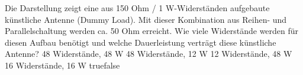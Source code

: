     {Die Darstellung zeigt eine aus 150 Ohm / 1 W-Widerständen aufgebaute künstliche Antenne (Dummy Load). Mit dieser Kombination aus Reihen- und Parallelschaltung werden ca. 50 Ohm erreicht. Wie viele Widerstände werden für diesen Aufbau benötigt und welche Dauerleistung verträgt diese künstliche Antenne?}
    {48 Widerstände, 48 W}
    {48 Widerstände, 12 W}
    {12 Widerstände, 48 W}
    {16 Widerstände, 16 W}
    {true}{false}